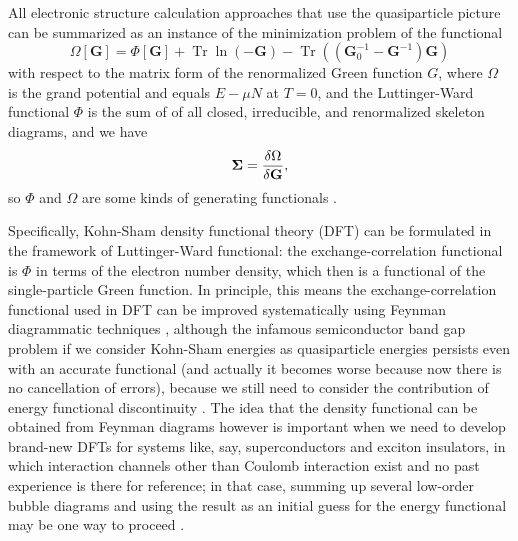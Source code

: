 \documentclass[hyperref, a4paper]{article}
\begin{document}
All electronic structure calculation approaches that use the quasiparticle picture 
can be summarized as an instance of the minimization problem 
of the functional 
\begin{equation}
    \Omega[\mathbf{G}]= \Phi[\mathbf{G}]+\operatorname{Tr} \ln (-\mathbf{G})-\operatorname{Tr}\left(\left(\mathbf{G}_0^{-1}-\mathbf{G}^{-1}\right) \mathbf{G}\right)
\end{equation}
with respect to the matrix form of the renormalized Green function $G$,
where $\Omega$ is the grand potential
and equals $E - \mu N$ at $T = 0$, 
and the Luttinger-Ward functional $\Phi$ 
is the sum of of all closed, irreducible, and renormalized skeleton diagrams,
and we have 
\begin{equation}
    \mathbf{\Sigma} = \fdv{\Omega}{\mathbf{G}}, 
\end{equation}
so $\Phi$ and $\Omega$ are some kinds of generating functionals
\cite{PhysRev.118.1417,potthoff2003self}.

Specifically, Kohn-Sham density functional theory (DFT) 
can be formulated in the framework of Luttinger-Ward functional: 
the exchange-correlation functional 
is $\Phi$ in terms of the electron number density,
which then is a functional of the single-particle Green function.
In principle, 
this means the exchange-correlation functional used in DFT
can be improved systematically using Feynman diagrammatic techniques
\cite{aryasetiawan2002total,gruning2006density,haule2015free},
although the infamous semiconductor band gap problem 
if we consider Kohn-Sham energies as quasiparticle energies
persists even with an accurate functional
(and actually it becomes worse because now there is no cancellation of errors),
because we still need to consider the contribution of 
energy functional discontinuity
\cite{gruning2006density}.
The idea that the density functional can be obtained from Feynman diagrams 
however is important when we need to develop 
brand-new DFTs for systems like, say, 
superconductors and exciton insulators,
in which interaction channels other than Coulomb interaction exist 
and no past experience is there for reference;
in that case, 
summing up several low-order bubble diagrams 
and using the result as an initial guess for the energy functional 
may be one way to proceed \cite{kurth1999local,chen2022development}.
\end{document}
